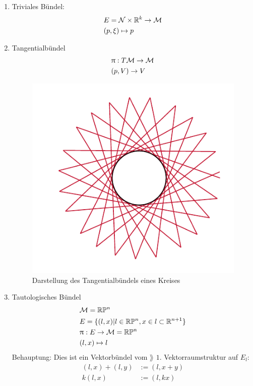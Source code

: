 \begin{bsp} \leavevmode
\begin{enumerate}
\item Triviales Bündel:
\begin{align}
&E = \mathcal{N} \times \mathbb{R}^k \to \mathcal{M}\\
&(p, \xi) \mapsto p
\end{align}
\item Tangentialbündel 
\begin{align}
&\uppi: T\mathcal{M} \to \mathcal{M}\\
&(p, V) \to V
\end{align}
\begin{figure}[H]
\centering
\includegraphics[scale=0.7]{figures/tikz/tangent_bundle.pdf}
\caption{Darstellung des Tangentialbündels eines Kreises}
\label{img:tangent_bundle}
\end{figure}

\item Tautologisches Bündel
\begin{align}
&\mathcal{M} = \mathbb{R} \mathbb{P}^n\\
&E = \{ (l, x) \vert l \in \mathbb{R} \mathbb{P}^n, x\in l \subset \mathbb{R}^{n+1} \}\\
&\uppi: E \to \mathcal{M} = \mathbb{R} \mathbb{P}^n\\
&(l, x) \mapsto l
\end{align}
Behauptung: Dies ist ein Vektorbündel vom $\rang$ $1$.
Vektorraumstruktur auf $E_l$:
\begin{align}
(l, x) + (l, y) &:= (l, x + y)\\
k (l, x) &:= (l, k x)
\end{align}
\end{enumerate}
\end{bsp}
